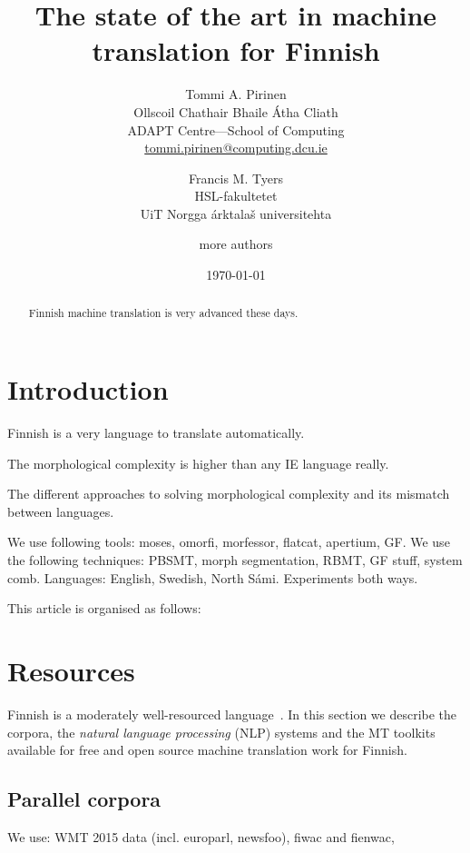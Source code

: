 \documentclass[b5paper]{article}
\title{The state of the art in machine translation for Finnish\blfootnote{
    This work is licensed under a Creative Commons Attribution–NoDerivatives
    4.0 International Licence.  Licence details:
    \url{http://creativecommons.org/licenses/by-nd/4.0/}}
}
\author{Tommi A. Pirinen\\
Ollscoil Chathair Bhaile Átha Cliath\\
ADAPT Centre---School of Computing\\
\url{tommi.pirinen@computing.dcu.ie}
\and Francis M. Tyers \\
HSL-fakultetet \\
UiT Norgga árktalaš universitehta \and 
more authors}
\date{\today}
\begin{document}
\maketitle

\begin{abstract}
Finnish machine translation is very advanced these days.
\end{abstract}

\section{Introduction}
\label{sec:introduction}

Finnish is a very language to translate automatically.

The morphological complexity is higher than any IE language really.

The different approaches to solving morphological complexity and its mismatch between languages.

We use following tools: moses, omorfi, morfessor, flatcat, apertium, GF.
We use the following techniques: PBSMT, morph segmentation, RBMT, GF stuff, system comb.
Languages: English, Swedish, North Sámi.
Experiments both ways. 

This article is organised as follows:





\section{Resources}

Finnish is a moderately well-resourced language~\cite{whitepaper}.
In this section we describe the corpora, the \textit{natural language processing} (NLP) systems and the MT toolkits available for free and open source machine translation work for Finnish.

\subsection{Parallel corpora}

We use: WMT 2015 data (incl. europarl, newsfoo), fiwac and fienwac, 
\end{document}
